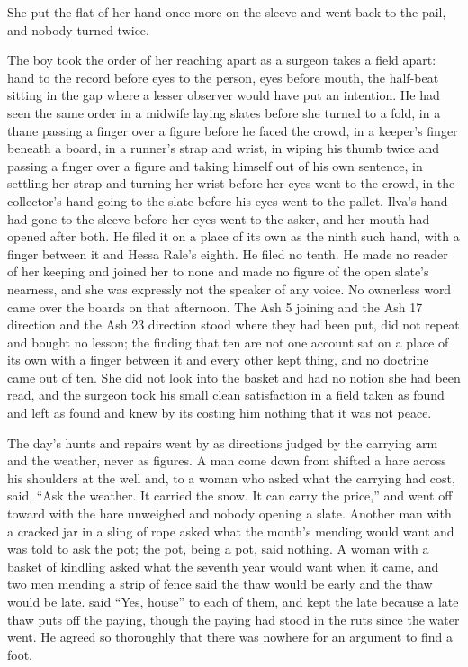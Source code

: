 She put the flat of her hand once more on the sleeve and went back to the pail, and nobody turned twice.

\scenebreak

The boy took the order of her reaching apart as a surgeon takes a field apart: hand to the record before eyes to the person, eyes before mouth, the half-beat sitting in the gap where a lesser observer would have put an intention. He had seen the same order in a midwife laying slates before she turned to a fold, in a thane passing a finger over a figure before he faced the crowd, in a keeper's finger beneath a board, in a runner's strap and wrist, in  wiping his thumb twice and passing a finger over a figure and taking himself out of his own sentence, in  settling her strap and turning her wrist before her eyes went to the crowd, in the collector's hand going to the slate before his eyes went to the pallet. Ilva's hand had gone to the sleeve before her eyes went to the asker, and her mouth had opened after both. He filed it on a place of its own as the ninth such hand, with a finger between it and Hessa Rale's eighth. He filed no tenth. He made no reader of her keeping and joined her to none and made no figure of the open slate's nearness, and she was expressly not the speaker of any voice. No ownerless word came over the boards on that afternoon. The Ash 5 joining and the Ash 17 direction and the Ash 23 direction stood where they had been put, did not repeat and bought no lesson; the finding that ten are not one account sat on a place of its own with a finger between it and every other kept thing, and no doctrine came out of ten. She did not look into the basket and had no notion she had been read, and the surgeon took his small clean satisfaction in a field taken as found and left as found and knew by its costing him nothing that it was not peace.

The day's hunts and repairs went by as directions judged by the carrying arm and the weather, never as figures. A man come down from  shifted a hare across his shoulders at the well and, to a woman who asked what the carrying had cost, said, “Ask the weather. It carried the snow. It can carry the price,” and went off toward  with the hare unweighed and nobody opening a slate. Another man with a cracked jar in a sling of rope asked what the month's mending would want and was told to ask the pot; the pot, being a pot, said nothing. A woman with a basket of kindling asked what the seventh year would want when it came, and two men mending a strip of fence said the thaw would be early and the thaw would be late.  said “Yes, house” to each of them, and kept the late because a late thaw puts off the paying, though the paying had stood in the ruts since the water went. He agreed so thoroughly that there was nowhere for an argument to find a foot.


